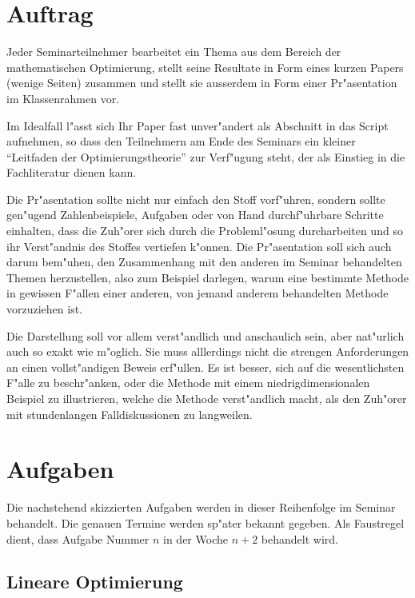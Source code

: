 \documentclass[a4paper,12pt]{article}
\begin{document}
\section{Auftrag}
Jeder Seminarteilnehmer bearbeitet ein Thema aus dem Bereich der
mathematischen Optimierung, stellt seine Resultate in Form eines
kurzen Papers (wenige Seiten) zusammen und stellt sie ausserdem
in Form einer Pr"asentation im Klassenrahmen vor.

Im Idealfall l"asst sich Ihr Paper fast unver"andert als Abschnitt
in das Script aufnehmen, so dass den Teilnehmern am Ende des Seminars
ein kleiner ``Leitfaden der Optimierungstheorie'' zur Verf"ugung steht,
der als Einstieg in die Fachliteratur dienen kann.

Die Pr"asentation sollte nicht nur einfach den Stoff vorf"uhren,
sondern sollte gen"ugend Zahlenbeispiele, Aufgaben oder von Hand
durchf"uhrbare Schritte einhalten, dass die Zuh"orer sich durch
die Probleml"osung durcharbeiten und so ihr Verst"andnis des
Stoffes vertiefen k"onnen. Die Pr"asentation soll sich auch darum
bem"uhen, den Zusammenhang mit den anderen im Seminar behandelten
Themen herzustellen, also zum Beispiel darlegen, warum eine bestimmte
Methode in gewissen F"allen einer anderen, von jemand anderem behandelten
Methode vorzuziehen ist.

Die Darstellung soll vor allem verst"andlich und anschaulich
sein, aber nat"urlich auch so exakt wie m"oglich.
Sie muss alllerdings nicht die strengen Anforderungen an einen
vollst"andigen Beweis erf"ullen. Es ist besser, sich auf die
wesentlichsten F"alle zu beschr"anken, oder die Methode mit
einem niedrigdimensionalen Beispiel zu illustrieren, welche
die Methode verst"andlich macht, als den Zuh"orer mit stundenlangen
Falldiskussionen zu langweilen.

\section{Aufgaben}
Die nachstehend skizzierten Aufgaben werden in dieser Reihenfolge im
Seminar behandelt. Die genauen Termine werden sp"ater bekannt
gegeben. Als Faustregel dient, dass Aufgabe Nummer $n$ in der Woche
$n + 2$ behandelt wird.

\newtheorem{aufgabe}{Aufgabe}

\subsection{Lineare Optimierung}



\end{document}
